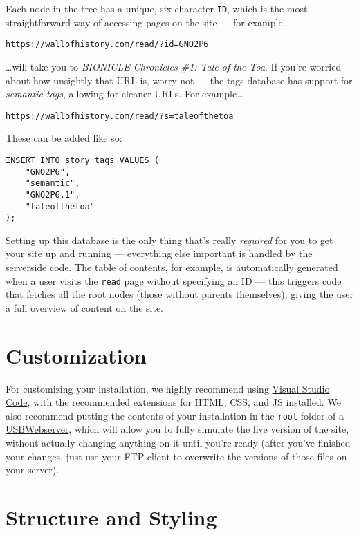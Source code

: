 \documentclass[11pt]{article} %
\begin{document}
Each node in the tree has a unique, six-character \texttt{ID}, which is the most straightforward way of accessing pages on the site — for example…
\begin{center}
\texttt{https://wallofhistory.com/read/?id=GNO2P6}
\end{center}
…will take you to \textit{BIONICLE Chronicles \#1: Tale of the Toa}. If you’re worried about how unsightly that URL is, worry not — the tags database has support for \textit{semantic tags}, allowing for cleaner URLs. For example…
\begin{center}
\texttt{https://wallofhistory.com/read/?s=taleofthetoa}
\end{center}

These can be added like so:

\begin{verbatim}
INSERT INTO story_tags VALUES (
    "GNO2P6",
    "semantic",
    "GNO2P6.1",
    "taleofthetoa"
);
\end{verbatim}

Setting up this database is the only thing that’s really \textit{required} for you to get your site up and running — everything else important is handled by the serverside code. The table of contents, for example, is automatically generated when a user visits the \texttt{read} page without specifying an ID — this triggers code that fetches all the root nodes (those without parents themselves), giving the user a full overview of content on the site.

\section{Customization}

For customizing your installation, we highly recommend using \href{https://code.visualstudio.com/}{Visual Studio Code}, with the recommended extensions for HTML, CSS, and JS installed. We also recommend putting the contents of your installation in the \texttt{root} folder of a \href{https://www.usbwebserver.net/webserver/}{USBWebserver}, which will allow you to fully simulate the live version of the site, without actually changing anything on it until you’re ready (after you’ve finished your changes, just use your FTP client to overwrite the versions of those files on your server).

\section{Structure and Styling}
\end{document}
